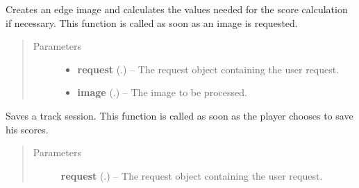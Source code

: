 \documentclass[letterpaper,10pt,english]{sphinxmanual}
\begin{document}
\begin{fulllineitems}
\label{Contour.contour:Contour.contour.views.process_image}
Creates an edge image and calculates the values needed for the score calculation if necessary. This function is called as soon as an image is requested.
\begin{quote}\begin{description}
\item[{Parameters}] \leavevmode\begin{itemize}
\item {} 
\textbf{request} (.) -- The request object containing the user request.

\item {} 
\textbf{image} (.) -- The image to be processed.

\end{itemize}

\end{description}\end{quote}

\end{fulllineitems}


\begin{fulllineitems}
\label{Contour.contour:Contour.contour.views.save_session}
Saves a track session. This function is called as soon as the player chooses to save his scores.
\begin{quote}\begin{description}
\item[{Parameters}] \leavevmode
\textbf{request} (.) -- The request object containing the user request.

\end{description}\end{quote}

\end{fulllineitems}

\end{document}
